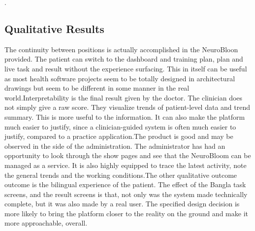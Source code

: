 \documentclass[12pt,a4paper]{report}
\begin{document}
.

\subsection{Qualitative Results}
The continuity between positions is actually accomplished in the NeuroBloon provided. The patient can switch to the dashboard and training plan, plan and live task and result without the experience surfacing. This in itself can be useful as most health software projects seem to be totally designed in architectural drawings but seem to be different in some manner in the real world.Interpretability is the final result given by the doctor. The clinician does not simply give a raw score. They visualize trends of patient-level data and trend summary. This is more useful to the information. It can also make the platform much easier to justify, since a clinician-guided system is often much easier to justify, compared to a practice application.The product is good and may be observed in the side of the administration. The administrator has had an opportunity to look through the show pages and see that the NeuroBloom can be managed as a service. It is also highly equipped to trace the latest activity, note the general trends and the working conditions.The other qualitative outcome outcome is the bilingual experience of the patient. The effect of the Bangla task screens, and the result screens is that, not only was the system made technically complete, but it was also made by a real user. The specified design decision is more likely to bring the platform closer to the reality on the ground and make it more approachable, overall.
\end{document}
